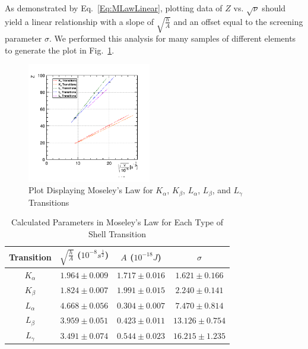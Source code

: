 \documentclass[%
 reprint,
 amsmath,amssymb,
 aps,
 pra,
]{revtex4-1}
\begin{document}
As demonstrated by Eq.~\ref{Eq:MLawLinear}, plotting data of $Z$ vs. $\sqrt{\nu}$ should yield a linear relationship with a slope of $\sqrt{\frac{h}{A}}$ and an offset equal to the screening parameter $\sigma$. We performed this analysis for many samples of different elements to generate the plot in Fig.~\ref{Fig:MLawPlot}.

\begin{figure}[H]
	\centering
	\includegraphics[width=0.48\textwidth]{MoseleyLawPlot.png}
	\caption{Plot Displaying Moseley's Law for $K_{\alpha}$, $K_{\beta}$, $L_{\alpha}$, $L_{\beta}$, and $L_{\gamma}$ Transitions}
	\label{Fig:MLawPlot}
\end{figure} 

\begin{table}[htbp]
	\begin{center}
		\begin{tabular}{|c|c|c|c|}
			\hline Transition & $\sqrt{\frac{h}{A}}$ ($ 10^{-8} s^{\frac{1}{2}}$)  & $A$ ($10^{-18} J$) & $\sigma$ \\
			\hline $K_{\alpha}$ & $1.964 \pm 0.009$ & $1.717 \pm 0.016$ & $1.621 \pm 0.166$ \\
			\hline $K_{\beta}$ & $1.824 \pm 0.007$ & $1.991 \pm 0.015$ & $2.240 \pm 0.141$ \\
			\hline $L_{\alpha}$ & $4.668 \pm 0.056$ & $0.304 \pm 0.007$ & $7.470 \pm 0.814$ \\
			\hline $L_{\beta}$ & $3.959 \pm 0.051$ & $0.423 \pm 0.011$ & $13.126 \pm 0.754$ \\
			\hline $L_{\gamma}$ & $3.491 \pm 0.074$ & $0.544 \pm 0.023$ & $16.215 \pm 1.235$ \\
			\hline
		\end{tabular}
	\end{center}
	\caption{Calculated Parameters in Moseley's Law for Each Type of Shell Transition}
	\label{Tab:MLawData}
\end{table}
\end{document}

